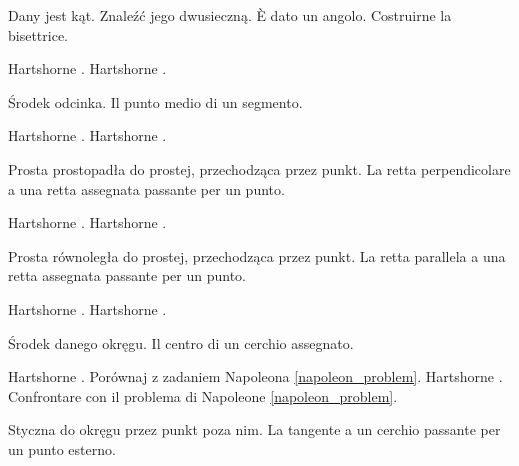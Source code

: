 \begin{geoconstruction}
    Dany jest kąt. %
    Znaleźć jego dwusieczną. %
    È dato un angolo. %
    Costruirne la bisettrice. %
%
\end{geoconstruction}

Hartshorne \cite[s. 23]{hartshorne_2000}. %
Hartshorne \cite[p. 23]{hartshorne_2000}. %

\begin{problem}
    Środek odcinka. %
    Il punto medio di un segmento. %
\end{problem}

Hartshorne \cite[s. 23]{hartshorne_2000}. %
Hartshorne \cite[p. 23]{hartshorne_2000}. %

\begin{problem}
    Prosta prostopadła do prostej, przechodząca przez punkt. %
    La retta perpendicolare a una retta assegnata passante per un punto. %
\end{problem}

Hartshorne \cite[s. 23, 24]{hartshorne_2000}. %
Hartshorne \cite[p. 23, 24]{hartshorne_2000}. %

\begin{problem}
    Prosta równoległa do prostej, przechodząca przez punkt. %
    La retta parallela a una retta assegnata passante per un punto. %
\end{problem}

Hartshorne \cite[s. 24]{hartshorne_2000}. %
Hartshorne \cite[p. 24]{hartshorne_2000}. %

\begin{problem}
    Środek danego okręgu. %
    Il centro di un cerchio assegnato. %
\end{problem}

Hartshorne \cite[s. 24]{hartshorne_2000}. %
Porównaj z zadaniem Napoleona \ref{napoleon_problem}. %
Hartshorne \cite[p. 24]{hartshorne_2000}. %
Confrontare con il problema di Napoleone \ref{napoleon_problem}. %

\begin{problem}
    Styczna do okręgu przez punkt poza nim. %
    La tangente a un cerchio passante per un punto esterno. %
\end{problem}

